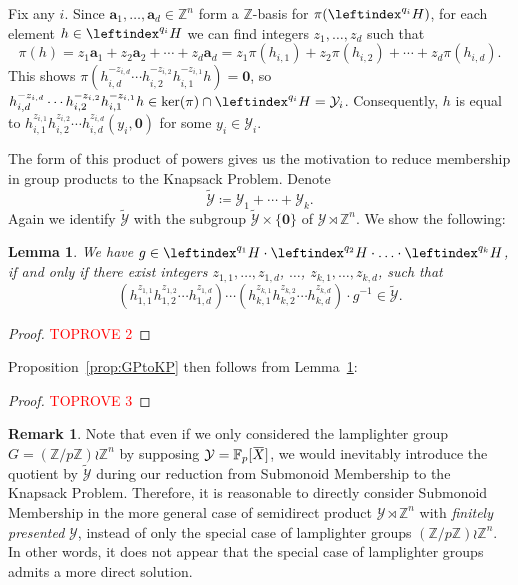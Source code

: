 \documentclass[a4paper,UKenglish,cleveref, autoref, thm-restate]{lipics-v2021}
\newcommand{\Z}{\mathbb{Z}}
\newcommand{\F}{\mathbb{F}}
\newcommand{\mY}{\mathcal{Y}}
\newcommand{\tY}{\widetilde{\mathcal{Y}}}
\newcommand{\ba}{\boldsymbol{a}}
\newcommand{\bzer}{\boldsymbol{0}}
\newcommand{\oX}{\mkern 1.5mu\overline{\mkern-1.5mu X \mkern-1.5mu}\mkern 1.5mu}
\newtheorem{lem}[thrm]{Lemma}
\theoremstyle{definition}
\theoremstyle{definition}
\theoremstyle{definition}
\newtheorem{rmk}[thrm]{Remark}
\begin{document}
Fix any $i$. Since $\ba_1, \ldots, \ba_{d} \in \Z^n$ form a $\Z$-basis for $\pi(\leftindex^{q_i}{H})$, for each element $h \in \leftindex^{q_i}{H}$ we can find integers $z_1, \ldots, z_d$ such that 
\[
\pi(h) = z_1 \ba_1 + z_2 \ba_2 + \cdots + z_d \ba_d = z_1 \pi(h_{i,1}) + z_2 \pi(h_{i,2}) + \cdots + z_d \pi(h_{i,d}).
\]
This shows $\pi(h_{i, d}^{- z_{i, d}} \cdots h_{i, 2}^{- z_{i, 2}} h_{i, 1}^{- z_{i, 1}} h) = \bzer$, so $h_{i, d}^{- z_{i, d}} \cdots h_{i, 2}^{- z_{i, 2}} h_{i, 1}^{- z_{i, 1}} h \in \ker(\pi) \cap \leftindex^{q_i}{H} = \mY_i$.
Consequently, $h$ is equal to $h_{i,1}^{z_{i, 1}} h_{i,2}^{z_{i, 2}} \cdots h_{i,d}^{z_{i, d}} (y_i, \bzer)$ for some $y_i \in \mY_i$.

The form of this product of powers gives us the motivation to reduce membership in group products to the Knapsack Problem. 
Denote
\[
\tY \coloneqq \mY_1 + \cdots + \mY_k.
\]
Again we identify $\tY$ with the subgroup $\tY \times \{\bzer\}$ of $\mY \rtimes \Z^n$. We show the following:

\begin{lem}\label{lem:SMtoKP}
    We have $g \in \leftindex^{q_1}{H} \cdot \leftindex^{q_2}{H} \cdot \ldots \cdot \leftindex^{q_{k}}{H}$, if and only if there exist integers $z_{1, 1}, \ldots, z_{1, d}$, $\ldots$, $z_{k, 1}, \ldots, z_{k, d}$, such that
    \begin{equation}\label{eq:SMtoKP}
        \left(h_{1,1}^{z_{1, 1}} h_{1,2}^{z_{1, 2}} \cdots h_{1,d}^{z_{1, d}}\right) \cdots \left(h_{k,1}^{z_{k, 1}} h_{k,2}^{z_{k, 2}} \cdots h_{k,d}^{z_{k, d}}\right) \cdot g^{-1} \in \tY.
    \end{equation}
\end{lem}
\begin{proof}\textcolor{red}{TOPROVE 2}\end{proof}

Proposition~\ref{prop:GPtoKP} then follows from Lemma~\ref{lem:SMtoKP}:
\begin{proof}\textcolor{red}{TOPROVE 3}\end{proof}

\begin{rmk}\label{rmk:noteasy}
Note that even if we only considered the lamplighter group $G = (\Z/p\Z) \wr \Z^n$ by supposing $\mY = \F_p[\oX]$, we would inevitably introduce the quotient by $\tY$ during our reduction from Submonoid Membership to the Knapsack Problem. Therefore, it is reasonable to directly consider Submonoid Membership in the more general case of semidirect product $\mY \rtimes \Z^n$ with \emph{finitely presented} $\mY$, instead of only the special case of lamplighter groups $(\Z/p\Z) \wr \Z^n$. In other words, it does not appear that the special case of lamplighter groups admits a more direct solution.
\end{rmk}
\end{document}
